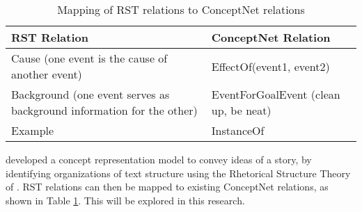 \begin{table}[ht]   %
\centering
\caption{Mapping of RST relations to ConceptNet relations} \vspace{0.25em}
\begin{tabular}{|p{7cm}|l|} \hline
RST Relation & ConceptNet Relation \\ \hline
Cause (one event is the cause of another event) & EffectOf(event1, event2) \\ \hline
Background (one event serves as background information for the other) & EventForGoalEvent (clean up, be neat) \\ \hline
Example & InstanceOf \\ \hline
\end{tabular}
\label{tab:mappingrstconceptnet}
\end{table}

 developed a concept representation model to convey ideas of a story, by identifying organizations of text structure using the Rhetorical Structure Theory of . RST relations can then be mapped to existing ConceptNet relations, as shown in Table \ref{tab:mappingrstconceptnet}. This will be explored in this research.